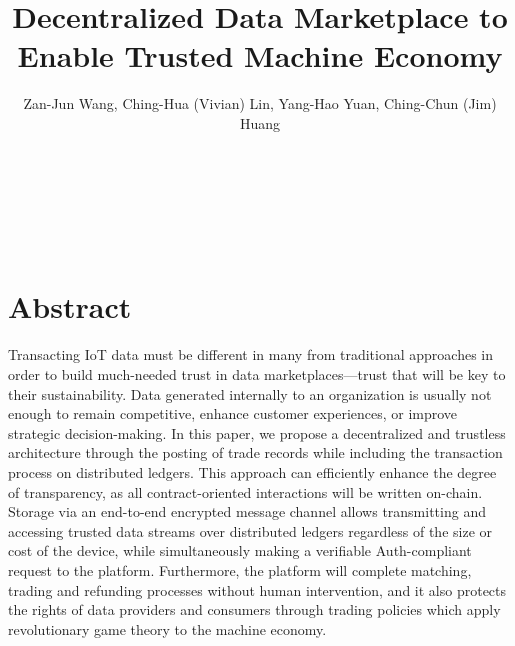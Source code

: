 \documentclass[journal,10pt,a4paper]{IEEEtran}
\begin{document}
\title{\Large\textbf{Decentralized Data Marketplace to Enable Trusted Machine Economy}}
\author{
    \large Zan-Jun Wang, Ching-Hua (Vivian) Lin, Yang-Hao Yuan, Ching-Chun (Jim) Huang

     \\
     \\
     \\

     \\

     \\

}

\maketitle
\section*{\normalsize\textbf{Abstract}}
Transacting IoT data must be different in many from traditional approaches in order to build much-needed trust in data marketplaces—trust that will be key to their sustainability. Data generated internally to an organization is usually not enough to remain competitive, enhance customer experiences, or improve strategic decision-making. In this paper, we propose a decentralized and trustless architecture through the posting of trade records while including the transaction process on distributed ledgers. This approach can efficiently enhance the degree of transparency, as all contract-oriented interactions will be written on-chain. Storage via an end-to-end encrypted message channel allows transmitting and accessing trusted data streams over distributed ledgers regardless of the size or cost of the device, while simultaneously making a verifiable Auth-compliant request to the platform. Furthermore, the platform will complete matching, trading and refunding processes without human intervention, and it also protects the rights of data providers and consumers through trading policies which apply revolutionary game theory to the machine economy.
\end{document}
